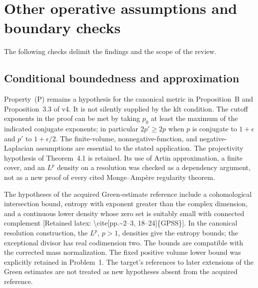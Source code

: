 \documentclass[10pt]{article}
\begin{document}
\section*{Other operative assumptions and boundary checks}
The following checks delimit the findings and the scope of the review.\par
\subsection*{Conditional boundedness and approximation}
Property (P) remains a hypothesis for the canonical metric in Proposition B and Proposition 3.3 of v4. It is not silently supplied by the klt condition. The cutoff exponents in the proof can be met by taking \(p_0\) at least the maximum of the indicated conjugate exponents; in particular \(2p'\geq2p\) when \(p\) is conjugate to \(1+\epsilon\) and \(p'\) to \(1+\epsilon/2\). The finite-volume, nonnegative-function, and negative-Laplacian assumptions are essential to the stated application. The projectivity hypothesis of Theorem 4.1 is retained. Its use of Artin approximation, a finite cover, and an \(L^p\) density on a resolution was checked as a dependency argument, not as a new proof of every cited Monge–Ampère regularity theorem.\par
The hypotheses of the acquired Green-estimate reference include a cohomological intersection bound, entropy with exponent greater than the complex dimension, and a continuous lower density whose zero set is suitably small with connected complement [Retained latex: \textbackslash{}cite[pp.\textasciitilde{}2--3, 18--24]\{GPSS\}]. In the canonical resolution construction, the \(L^p\), \(p>1\), densities give the entropy bounds; the exceptional divisor has real codimension two. The bounds are compatible with the corrected mass normalization. The fixed positive volume lower bound was explicitly retained in Problem 1. The target’s references to later extensions of the Green estimates are not treated as new hypotheses absent from the acquired reference.\par
\end{document}
